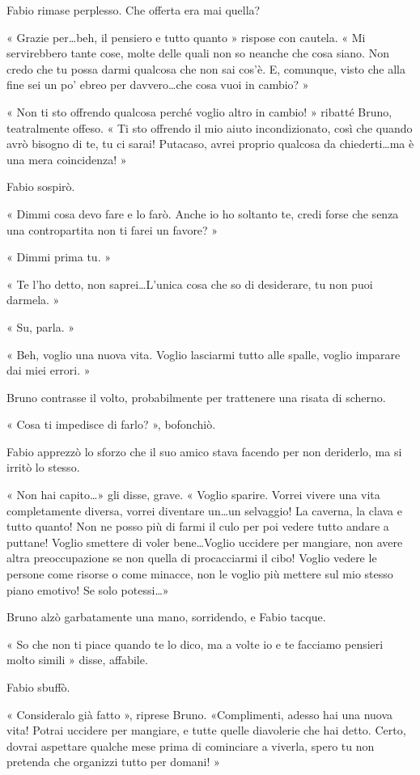 Fabio rimase perplesso. Che offerta era mai quella?

« Grazie per\ldots beh, il pensiero e tutto quanto » rispose con cautela. « Mi servirebbero tante cose, molte delle quali non so neanche che cosa siano. Non credo che tu possa darmi qualcosa che non sai cos'è. E, comunque, visto che alla fine sei un po' ebreo per davvero\ldots che cosa vuoi in cambio? »

« Non ti sto offrendo qualcosa perché voglio altro in cambio! » ribatté Bruno, teatralmente offeso. « Ti sto offrendo il mio aiuto incondizionato, così che quando avrò bisogno di te, tu ci sarai! Putacaso, avrei proprio qualcosa da chiederti\ldots ma è una mera coincidenza! »

Fabio sospirò.

« Dimmi cosa devo fare e lo farò. Anche io ho soltanto te, credi forse che senza una contropartita non ti farei un favore? »

« Dimmi prima tu. »

« Te l'ho detto, non saprei\ldots L'unica cosa che so di desiderare, tu non puoi darmela. »

« Su, parla. »

« Beh, voglio una nuova vita. Voglio lasciarmi tutto alle spalle, voglio imparare dai miei errori. »

Bruno contrasse il volto, probabilmente per trattenere una risata di scherno.

« Cosa ti impedisce di farlo? », bofonchiò.

Fabio apprezzò lo sforzo che il suo amico stava facendo per non deriderlo, ma si irritò lo stesso.

« Non hai capito\ldots » gli disse, grave. « Voglio sparire. Vorrei vivere una vita completamente diversa, vorrei diventare un\ldots un selvaggio! La caverna, la clava e tutto quanto! Non ne posso più di farmi il culo per poi vedere tutto andare a puttane! Voglio smettere di voler bene\ldots Voglio uccidere per mangiare, non avere altra preoccupazione se non quella di procacciarmi il cibo! Voglio vedere le persone come risorse o come minacce, non le voglio più mettere sul mio stesso piano emotivo! Se solo potessi\ldots »

Bruno alzò garbatamente una mano, sorridendo, e Fabio tacque.

« So che non ti piace quando te lo dico, ma a volte io e te facciamo pensieri molto simili » disse, affabile.

Fabio sbuffò.

« Consideralo già fatto », riprese Bruno. «Complimenti, adesso hai una nuova vita! Potrai uccidere per mangiare, e tutte quelle diavolerie che hai detto. Certo, dovrai aspettare qualche mese prima di cominciare a viverla, spero tu non pretenda che organizzi tutto per domani! »

